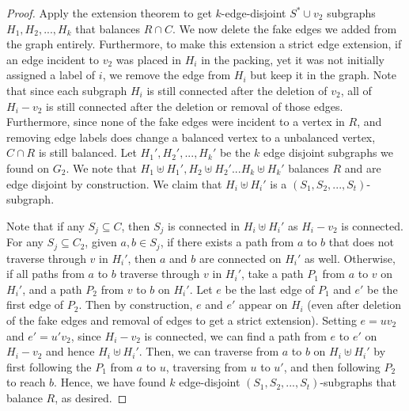 \documentclass[10pt,a4paper]{amsart}
\begin{document}
\begin{proof}
    Apply the extension theorem to get $k$-edge-disjoint $S^* \cup v_2$ subgraphs $H_1,H_2,...,H_k$ that balances $R \cap C$. We now delete the fake edges we added from the graph entirely. Furthermore, to make this extension a strict edge extension, if an edge incident to $v_2$ was placed in $H_i$ in the packing, yet it was not initially assigned a label of $i$, we remove the edge from $H_i$ but keep it in the graph. Note that since each subgraph $H_i$ is still connected after the deletion of $v_2$, all of $H_i-v_2$ is still connected after the deletion or removal of those edges. Furthermore, since none of the fake edges were incident to a vertex in $R$, and removing edge labels does change a balanced vertex to a unbalanced vertex, $C \cap R$ is still balanced. Let $H_1',H_2',...,H_k'$ be the $k$ edge disjoint subgraphs we found on $G_2$. We note that $H_1 \uplus H_1', H_2 \uplus H_2'... H_k \uplus H_k'$ balances $R$ and are edge disjoint by construction. We claim that $H_i \uplus H_i'$ is a $(S_1,S_2,...,S_t)$-subgraph. 

    Note that if any $S_j \subseteq C$, then $S_j$ is connected in $H_i \uplus H_i'$ as $H_i-v_2$ is connected. For any $S_j \subseteq C_2$, given $a, b \in S_j$, if there exists a path from $a$ to $b$ that does not traverse through $v$ in $H_i'$, then $a$ and $b$ are connected on $H_i'$ as well. Otherwise, if all paths from $a$ to $b$ traverse through $v$ in $H_i'$, take a path $P_1$ from $a$ to $v$ on $H_i'$, and a path $P_2$ from $v$ to $b$ on $H_i'$. Let $e$ be the last edge of $P_1$ and $e'$ be the first edge of $P_2$. Then by construction, $e$ and $e'$ appear on $H_i$ (even after deletion of the fake edges and removal of edges to get a strict extension). Setting $e = uv_2$ and $e' = u'v_2$, since $H_i-v_2$ is connected, we can find a path from $e$ to $e'$ on $H_i-v_2$ and hence $H_i \uplus H_i'$. Then, we can traverse from $a$ to $b$ on $H_i \uplus H_i'$ by first following the $P_1$ from $a$ to $u$, traversing from $u$ to $u'$, and then following $P_2$ to reach $b$. Hence, we have found $k$ edge-disjoint $(S_1,S_2,...,S_t)$-subgraphs that balance $R$, as desired. 
\end{proof}
\end{document}
